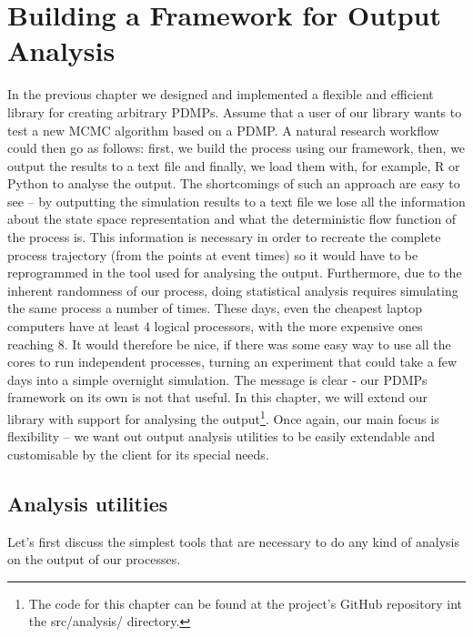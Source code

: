 \documentclass[report.tex]{subfiles}
\begin{document}
\chapter{Building a Framework for Output Analysis}
\label{output-analysis-framework}

In the previous chapter we designed and implemented a flexible and efficient
library for creating arbitrary PDMPs.
Assume that a user of our library wants to test a new MCMC algorithm based on
a PDMP.
A natural research workflow could then go as follows: first, we build the process
using our framework, then, we output the results to a text file and finally, we load
them with, for example, R or Python to analyse the output.
The shortcomings of such an approach are easy to see --
by outputting the simulation results to a text file we lose all the information
about the state space representation and what the deterministic flow function of the
process is.
This information is necessary in order to recreate the complete process trajectory (from the points at event times)
so it would have to be reprogrammed in the tool used for analysing the output.
Furthermore, due to the inherent randomness of our process, doing statistical
analysis requires simulating the same process a number of times.
These days, even the cheapest laptop computers have at least 4 logical processors, with the more
expensive ones reaching 8.
It would therefore be nice, if there was some easy way to use all the cores to run
independent processes, turning an experiment that could take a few days into a
simple overnight simulation.
The message is clear - our PDMPs framework on its own is not that useful.
In this chapter, we will extend our library with support for analysing the
output\footnote{The code for this chapter can be found at the project's GitHub
repository int the src/analysis/ directory.}.
Once again, our main focus is flexibility -- we want out output analysis utilities
to be easily extendable and customisable by the client for its special needs.

\section{Analysis utilities}
Let's first discuss the simplest tools that are necessary to do any kind of analysis
on the output of our processes.
\end{document}
